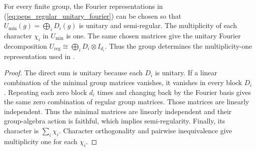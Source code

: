 \begin{lemma}
    \label{thm:peps_regular_minimal_representation}
    \leanok
    For every finite group, the Fourier representations in
    (\ref{eq:peps_regular_unitary_fourier}) can be chosen so that
    $U_{\min}(g)=\bigoplus_i D_i(g)$ is unitary and semi-regular.
    The multiplicity of each character $\chi_i$ in $U_{\min}$ is one.
    The same chosen matrices give the unitary Fourier decomposition
    $U_{\mathrm{reg}}\cong\bigoplus_i D_i\otimes I_{d_i}$.
    Thus the group determines the multiplicity-one representation used
    in \cite[Section~7]{Schuch2010PEPS}.
\end{lemma}
\begin{proof}\leanok
    The direct sum is unitary because each $D_i$ is unitary. If a linear
    combination of the minimal group matrices vanishes, it vanishes in
    every block $D_i$. Repeating each zero block $d_i$ times and changing
    back by the Fourier basis gives the same zero combination of
    regular group matrices. Those matrices are linearly independent.
    Thus the minimal matrices are linearly independent and their
    group-algebra action is faithful, which implies semi-regularity.
    Finally, its character is $\sum_i\chi_i$. Character orthogonality
    and pairwise inequivalence give multiplicity one for each $\chi_i$.
\end{proof}
